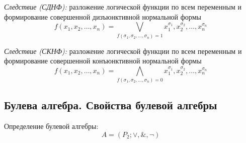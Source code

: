 \documentclass[a4paper,12pt]{report}
\begin{document}
	\textit{Следствие (СДНФ):} разложение
	логической функции по всем переменным и формирование совершенной
	дизъюнктивной нормальной формы
	$$ f(x_1, x_2, \dots, x_n) = \bigvee_{f(\sigma_1, \sigma_2, \dots, \sigma_n)
	= 1} x^{\sigma_1}_1, x^{\sigma_2}_2, \dots, x^{\sigma_n}_n $$

	\textit{Следствие (СКНФ):} разложение
	логической функции по всем переменным и формирование совершенной
	конъюнктивной нормальной формы
	$$ f(x_1, x_2, \dots, x_n) = \bigwedge_{f(\sigma_1, \sigma_2, \dots, \sigma_n)
	= 0} x^{\sigma_1}_1, x^{\sigma_2}_2, \dots, x^{\sigma_n}_n $$


\subsection{Булева алгебра. Свойства булевой алгебры}
	Определение булевой алгебры:
	$$ A = (P_2; \vee, \&, \neg) $$
\end{document}
